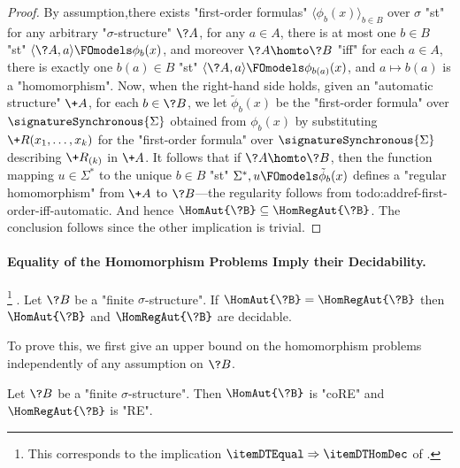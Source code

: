 \begin{proof}
	By assumption,there exists "first-order formulas"
	$\langle \phi_b(x) \rangle_{b\in B}$ over $\sigma$ "st" for any
	arbitrary "$\sigma$-structure" $\?A$, for any $a\in A$,
	there is at most one $b \in B$ "st" $\langle \?A, a \rangle \FOmodels \phi_b(x)$, and moreover $\?A \homto \?B$
	"iff" for each $a\in A$, there is exactly one $b(a) \in B$ "st" $\langle \?A, a \rangle \FOmodels \phi_{b(a)}(x)$, and $a \mapsto b(a)$ is a "homomorphism".
	Now, when the right-hand side holds, given an "automatic structure" $\+A$,
	for each $b\in \?B$, we let $\tilde\phi_b(x)$ be the "first-order formula" over $\signatureSynchronous{\Sigma}$ obtained from $\phi_b(x)$
	by substituting $\+R(x_1,\hdots,x_k)$ for the "first-order formula"
	over $\signatureSynchronous{\Sigma}$ describing $\+R_{(k)}$ in $\+A$.
	It follows that if $\?A \homto \?B$, then the function
	mapping $u \in \Sigma^*$ to the unique $b \in B$ "st" $\Sigma^*, u \FOmodels \tilde\phi_b(x)$
	defines a "regular homomorphism" from $\+A$ to $\?B$---the regularity follows from
	todo:addref-first-order-iff-automatic.
	And hence $\HomAut{\?B} \subseteq \HomRegAut{\?B}$. The conclusion follows since
	the other implication is trivial.
\end{proof}

\paragraph*{Equality of the Homomorphism Problems Imply their Decidability.}

\begin{proposition}
	\!\footnote{This corresponds to the implication $\itemDTEqual \Rightarrow \itemDTHomDec$
	of .}
	\AP\label{prop:dichotomy-Equal-implies-HomDec}.
	Let $\?B$ be a "finite $\sigma$-structure".
	If $\HomAut{\?B} = \HomRegAut{\?B}$ then $\HomAut{\?B}$ and $\HomRegAut{\?B}$
	are decidable.
\end{proposition}

To prove this, we first give an upper bound on the homomorphism problems independently
of any assumption on $\?B$.
\begin{proposition}
	\AP\label{prop:dichotomy-general-upper-bounds}
	Let $\?B$ be a "finite $\sigma$-structure".
	Then $\HomAut{\?B}$ is "coRE" and $\HomRegAut{\?B}$ is "RE".
\end{proposition}

